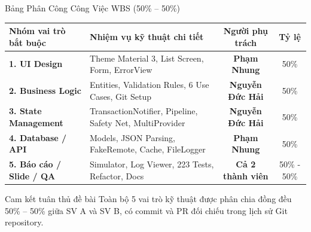 \documentclass[aspectratio=169, 10pt]{beamer}
\newcommand{\speakerB}{\hfill\tcbox[colback=NavyPrimary,colframe=NavyPrimary,boxsep=1pt,left=3pt,right=3pt,top=1pt,bottom=1pt]{\tiny\bfseries\color{white}SV B: Phạm Nhung}}
\begin{document}
\begin{frame}{Bảng Phân Công Công Việc WBS (50\% -- 50\%) \speakerB}
  \vspace{-1mm}
  \begin{table}[h]
    \centering
    \renewcommand{\arraystretch}{1.1}
    {\scriptsize
    \begin{tabularx}{\textwidth}{l p{7.2cm} c c}
      \toprule
      \rowcolor{NavyPrimary!15}
      \textbf{Nhóm vai trò bắt buộc} & \textbf{Nhiệm vụ kỹ thuật chi tiết} & \textbf{Người phụ trách} & \textbf{Tỷ lệ} \\
      \midrule
      \textbf{1. UI Design} & Theme Material 3, List Screen, Form, ErrorView & \textbf{Phạm Nhung} & 50\% \\
      \textbf{2. Business Logic} & Entities, Validation Rules, 6 Use Cases, Git Setup & \textbf{Nguyễn Đức Hải} & 50\% \\
      \textbf{3. State Management} & TransactionNotifier, Pipeline, Safety Net, MultiProvider & \textbf{Nguyễn Đức Hải} & 50\% \\
      \textbf{4. Database / API} & Models, JSON Parsing, FakeRemote, Cache, FileLogger & \textbf{Phạm Nhung} & 50\% \\
      \rowcolor{SlateLight}
      \textbf{5. Báo cáo / Slide / QA} & Simulator, Log Viewer, 223 Tests, Refactor, Docs & \textbf{Cả 2 thành viên} & 50\% - 50\% \\
      \bottomrule
    \end{tabularx}}
  \end{table}

  \begin{infobox}{Cam kết tuân thủ đề bài}
    \scriptsize Toàn bộ 5 vai trò kỹ thuật được phân chia đồng đều 50\% -- 50\% giữa SV A và SV B, có commit và PR đối chiếu trong lịch sử Git repository.
  \end{infobox}
\end{frame}
\end{document}
